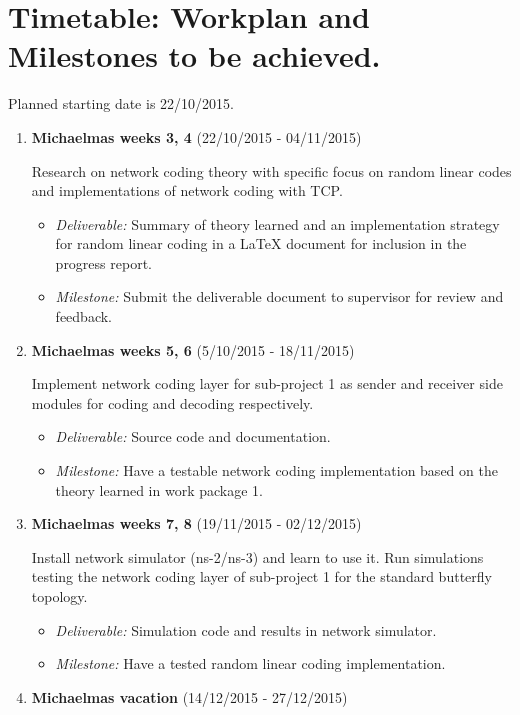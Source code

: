 \documentclass[12pt,a4paper,twoside]{article}
\begin{document}
\section*{Timetable: Workplan and Milestones to be achieved.}

Planned starting date is 22/10/2015.

\begin{enumerate}

\item {\bf Michaelmas weeks 3, 4} (22/10/2015 - 04/11/2015)

Research on network coding theory with specific focus on random linear codes and implementations of network coding with TCP.
\begin{itemize}
  \item {\em Deliverable:} Summary of theory learned and an implementation strategy for random linear coding in a LaTeX document for inclusion in the progress report. 
  \item {\em Milestone:} Submit the deliverable document to supervisor for review and feedback.
\end{itemize}

\item {\bf Michaelmas weeks 5, 6} (5/10/2015 - 18/11/2015)

Implement network coding layer for sub-project 1 as sender and receiver side modules for coding and decoding respectively.
\begin{itemize}
  \item {\em Deliverable:} Source code and documentation.
  \item {\em Milestone:} Have a testable network coding implementation based on the theory learned in work package 1.
\end{itemize}

\item {\bf Michaelmas weeks 7, 8} (19/11/2015 - 02/12/2015)

Install network simulator (ns-2/ns-3) and learn to use it. Run simulations testing the network coding layer of sub-project 1 for the standard butterfly topology.
\begin{itemize}
  \item {\em Deliverable:} Simulation code and results in network simulator.
  \item {\em Milestone:} Have a tested random linear coding implementation.
\end{itemize}

\item {\bf Michaelmas vacation} (14/12/2015 - 27/12/2015)


\end{enumerate}
\end{document}
